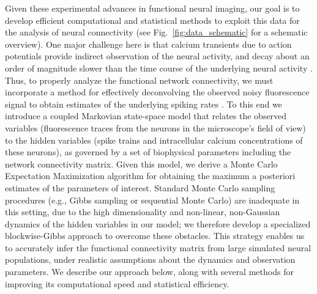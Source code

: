 Given these experimental advances in functional neural imaging, our goal is to develop efficient computational and statistical methods to exploit this data for the analysis of neural connectivity (see Fig.~\ref{fig:data_schematic} for a schematic overview). One major challenge here is that calcium transients due to action potentials provide indirect observation of the neural activity, and decay about an order of magnitude slower than the time course of the underlying neural activity \cite{ImagingManual}. Thus, to properly analyze the functional network connectivity, we must incorporate a method for effectively deconvolving the observed noisy fluorescence signal to obtain estimates of the underlying spiking rates \cite{YaksiFriedrich06,GreenbergKerr08,Vogelstein2009}. To this end we introduce a coupled Markovian state-space model that relates the observed variables (fluorescence traces from the neurons in the microscope's field of view) to the hidden variables (spike trains and intracellular calcium concentrations of these neurons), as governed by a set of biophysical parameters including the network connectivity matrix. Given this model, we derive a Monte Carlo Expectation Maximization algorithm for obtaining the maximum a posteriori estimates of the parameters of interest. Standard Monte Carlo sampling procedures (e.g., Gibbs sampling or sequential Monte Carlo) are inadequate in this setting, due to the high dimensionality and non-linear, non-Gaussian dynamics of the hidden variables in our model; we therefore develop a specialized blockwise-Gibbs approach to overcome these obstacles. This strategy enables us to accurately infer the functional connectivity matrix from large simulated neural populations, under realistic assumptions about the dynamics and observation parameters. We describe our approach below, along with several methods for improving its computational speed and statistical efficiency. 
